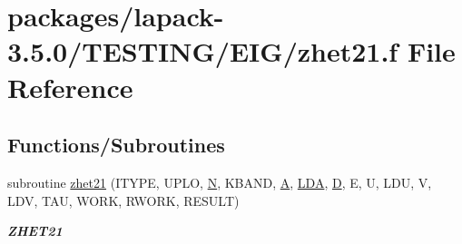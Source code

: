 \hypertarget{zhet21_8f}{}\section{packages/lapack-\/3.5.0/\+T\+E\+S\+T\+I\+N\+G/\+E\+I\+G/zhet21.f File Reference}
\label{zhet21_8f}
\subsection*{Functions/\+Subroutines}
\begin{DoxyCompactItemize}
\item 
subroutine \hyperlink{group__complex16__eig_gab79dcd8016959527ea3d7137912e932d}{zhet21} (I\+T\+Y\+P\+E, U\+P\+L\+O, \hyperlink{polmisc_8c_a0240ac851181b84ac374872dc5434ee4}{N}, K\+B\+A\+N\+D, \hyperlink{classA}{A}, \hyperlink{example__user_8c_ae946da542ce0db94dced19b2ecefd1aa}{L\+D\+A}, \hyperlink{odrpack_8h_a7dae6ea403d00f3687f24a874e67d139}{D}, E, U, L\+D\+U, V, L\+D\+V, T\+A\+U, W\+O\+R\+K, R\+W\+O\+R\+K, R\+E\+S\+U\+L\+T)
\begin{DoxyCompactList}\small\item\em {\bfseries Z\+H\+E\+T21} \end{DoxyCompactList}\end{DoxyCompactItemize}
